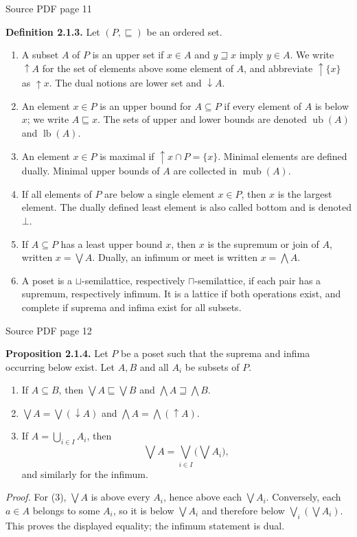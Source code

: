 \documentclass[11pt]{article}
\newcommand{\leanmarker}[2]{%
  \Needspace{3\baselineskip}%
  \marginnote{\hyperlink{#1}{\color{LeanTeal}\fbox{\scriptsize Lean}}}%
  \hypertarget{#1}{\textbf{#2.}}%
}
\newcommand{\sourcepage}[1]{\par\medskip\noindent\textcolor{SourceGray}{\scriptsize Source PDF page #1}\par\smallskip}
\begin{document}
\sourcepage{11}
\leanmarker{def-2-1-3}{Definition 2.1.3} Let $(P,\sqsubseteq)$ be an ordered set.
\begin{enumerate}
\item A subset $A$ of $P$ is an upper set if $x\in A$ and $y\sqsupseteq x$ imply $y\in A$. We write $\uparrow A$ for the set of elements above some element of $A$, and abbreviate $\uparrow\{x\}$ as $\uparrow x$. The dual notions are lower set and $\downarrow A$.
\item An element $x\in P$ is an upper bound for $A\subseteq P$ if every element of $A$ is below $x$; we write $A\sqsubseteq x$. The sets of upper and lower bounds are denoted $\operatorname{ub}(A)$ and $\operatorname{lb}(A)$.
\item An element $x\in P$ is maximal if $\uparrow x\cap P=\{x\}$. Minimal elements are defined dually. Minimal upper bounds of $A$ are collected in $\operatorname{mub}(A)$.
\item If all elements of $P$ are below a single element $x\in P$, then $x$ is the largest element. The dually defined least element is also called bottom and is denoted $\bot$.
\item If $A\subseteq P$ has a least upper bound $x$, then $x$ is the supremum or join of $A$, written $x=\bigvee A$. Dually, an infimum or meet is written $x=\bigwedge A$.
\item A poset is a $\sqcup$-semilattice, respectively $\sqcap$-semilattice, if each pair has a supremum, respectively infimum. It is a lattice if both operations exist, and complete if suprema and infima exist for all subsets.
\end{enumerate}

\sourcepage{12}
\leanmarker{prop-2-1-4}{Proposition 2.1.4} Let $P$ be a poset such that the suprema and infima occurring below exist. Let $A,B$ and all $A_i$ be subsets of $P$.
\begin{enumerate}
\item If $A\subseteq B$, then $\bigvee A\sqsubseteq \bigvee B$ and $\bigwedge A\sqsupseteq \bigwedge B$.
\item $\bigvee A=\bigvee(\downarrow A)$ and $\bigwedge A=\bigwedge(\uparrow A)$.
\item If $A=\bigcup_{i\in I} A_i$, then
\[
  \bigvee A = \bigvee_{i\in I}\bigl(\bigvee A_i\bigr),
\]
and similarly for the infimum.
\end{enumerate}
\emph{Proof.} For (3), $\bigvee A$ is above every $A_i$, hence above each $\bigvee A_i$. Conversely, each $a\in A$ belongs to some $A_i$, so it is below $\bigvee A_i$ and therefore below $\bigvee_i(\bigvee A_i)$. This proves the displayed equality; the infimum statement is dual.
\end{document}
